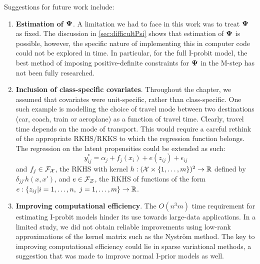 \documentclass[a4paper,showframe,11pt]{report}
\begin{document}
Suggestions for future work include:
\begin{enumerate}
  \item \textbf{Estimation of ${\bm\Psi}$}. 
  A limitation we had to face in this work was to treat ${\bm\Psi}$ as fixed.
  The discussion in \cref{sec:difficultPsi} shows that estimation of ${\bm\Psi}$ is possible, however, the specific nature of implementing this in computer code could not be explored in time.
  In particular, for the full I-probit model, the best method of imposing positive-definite constraints for ${\bm\Psi}$ in the M-step has not been fully researched.
  
  \item \textbf{Inclusion of class-specific covariates}. 
  Throughout the chapter, we assumed that covariates were unit-specific, rather than class-specific. 
  One such example is modelling the choice of travel mode between two destinations (car, coach, train or aeroplane) as a function of travel time. 
  Clearly, travel time depends on the mode of transport. 
  This would require a careful rethink of the appropriate RKHS/RKKS to which the regression function belongs.
  The regression on the latent propensities could be extended as such:
  \[
    y_{ij}^* = \alpha_j + f_j(x_i) + e(z_{ij}) + \epsilon_{ij}
  \]
  and $f_j\in {\mathcal F}_{\mathcal X}$, the RKHS with kernel $h:({\mathcal X} \times \{1,\dots,m \})^2\to\mathbb{R}$ defined by $\delta_{jj'}h(x,x')$, and $e \in {\mathcal F}_{\mathcal Z}$, the RKHS of functions of the form $e:\{z_{ij}|i=1,\dots,n, \ j=1,\dots,m \}\to\mathbb{R}$.
  
  \item \textbf{Improving computational efficiency}. 
  The $O(n^3m)$ time requirement for estimating I-probit models hinder its use towards large-data applications.
  In a limited study, we did not obtain reliable improvements using low-rank approximations of the kernel matrix such as the Nyström method.
  The key to improving computational efficiency could lie in sparse variational methods, a suggestion that was made to improve normal I-prior models as well.
\end{enumerate}
\end{document}
